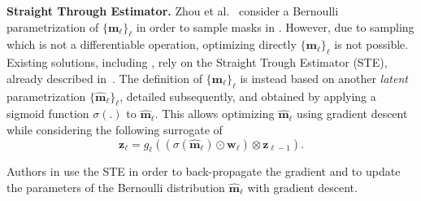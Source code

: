 \noindent\textbf{Straight Through Estimator.} Zhou et
al.~\cite{DBLP:conf/nips/ZhouLLY19} consider a Bernoulli parametrization of
$\{\bm{m}_\ell\}_\ell$ in order to sample masks in .
However, due to sampling which is not a differentiable operation, optimizing directly
$\{{\bm{m}_\ell}\}_\ell$ is not possible. Existing
solutions, including \cite{DBLP:conf/nips/ZhouLLY19}, rely on the Straight
Trough Estimator (STE), already described
in~\cite{DBLP:journals/corr/BengioLC13}.  The definition of
$\{\bm{m}_\ell\}_\ell$ is instead based on another {\it latent}
parametrization $\{\bm{\hat{m}}_\ell\}_\ell$, detailed subsequently, and
obtained by applying a sigmoid function $\sigma(.)$ to $\bm{\hat{m}}_\ell$.
This allows optimizing $\bm{\hat{m}}_\ell$  using gradient descent while
considering the following surrogate of   
\begin{equation}
  \label{eq:pruned_layer_eq2}
  \mathbf{z}_{\ell} = g_\ell( ( \sigma(\bm{\hat{m}}_\ell) \odot \bm{w}_\ell ) \otimes \mathbf{z}_{\ell-1} ).
\end{equation}

\noindent Authors in  \cite{DBLP:conf/nips/ZhouLLY19} use the STE in
order to back-propagate the gradient and to update the parameters of the
Bernoulli distribution $\bm{\hat{m}}_\ell$ with gradient descent.\\

